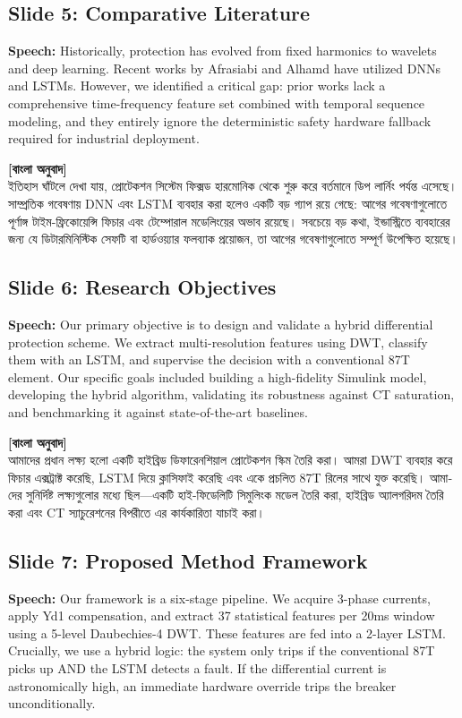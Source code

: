 \documentclass[12pt]{article}
\begin{document}
\subsection*{Slide 5: Comparative Literature}
\textbf{Speech:} Historically, protection has evolved from fixed harmonics to wavelets and deep learning. Recent works by Afrasiabi and Alhamd have utilized DNNs and LSTMs. However, we identified a critical gap: prior works lack a comprehensive time-frequency feature set combined with temporal sequence modeling, and they entirely ignore the deterministic safety hardware fallback required for industrial deployment.

\begin{bengali}
\textbf{[বাংলা অনুবাদ]} \\
ইতিহাস ঘাঁটলে দেখা যায়, প্রোটেকশন সিস্টেম ফিক্সড হারমোনিক থেকে শুরু করে বর্তমানে ডিপ লার্নিং পর্যন্ত এসেছে। সাম্প্রতিক গবেষণায় DNN এবং LSTM ব্যবহার করা হলেও একটি বড় গ্যাপ রয়ে গেছে: আগের গবেষণাগুলোতে পূর্ণাঙ্গ টাইম-ফ্রিকোয়েন্সি ফিচার এবং টেম্পোরাল মডেলিংয়ের অভাব রয়েছে। সবচেয়ে বড় কথা, ইন্ডাস্ট্রিতে ব্যবহারের জন্য যে ডিটারমিনিস্টিক সেফটি বা হার্ডওয়্যার ফলব্যাক প্রয়োজন, তা আগের গবেষণাগুলোতে সম্পূর্ণ উপেক্ষিত হয়েছে।
\end{bengali}

\subsection*{Slide 6: Research Objectives}
\textbf{Speech:} Our primary objective is to design and validate a hybrid differential protection scheme. We extract multi-resolution features using DWT, classify them with an LSTM, and supervise the decision with a conventional 87T element. Our specific goals included building a high-fidelity Simulink model, developing the hybrid algorithm, validating its robustness against CT saturation, and benchmarking it against state-of-the-art baselines.

\begin{bengali}
\textbf{[বাংলা অনুবাদ]} \\
আমাদের প্রধান লক্ষ্য হলো একটি হাইব্রিড ডিফারেনশিয়াল প্রোটেকশন স্কিম তৈরি করা। আমরা DWT ব্যবহার করে ফিচার এক্সট্রাক্ট করেছি, LSTM দিয়ে ক্লাসিফাই করেছি এবং একে প্রচলিত 87T রিলের সাথে যুক্ত করেছি। আমাদের সুনির্দিষ্ট লক্ষ্যগুলোর মধ্যে ছিল—একটি হাই-ফিডেলিটি সিমুলিংক মডেল তৈরি করা, হাইব্রিড অ্যালগরিদম তৈরি করা এবং CT স্যাচুরেশনের বিপরীতে এর কার্যকারিতা যাচাই করা।
\end{bengali}

\subsection*{Slide 7: Proposed Method Framework}
\textbf{Speech:} Our framework is a six-stage pipeline. We acquire 3-phase currents, apply Yd1 compensation, and extract 37 statistical features per 20ms window using a 5-level Daubechies-4 DWT. These features are fed into a 2-layer LSTM. Crucially, we use a hybrid logic: the system only trips if the conventional 87T picks up AND the LSTM detects a fault. If the differential current is astronomically high, an immediate hardware override trips the breaker unconditionally.
\end{document}

